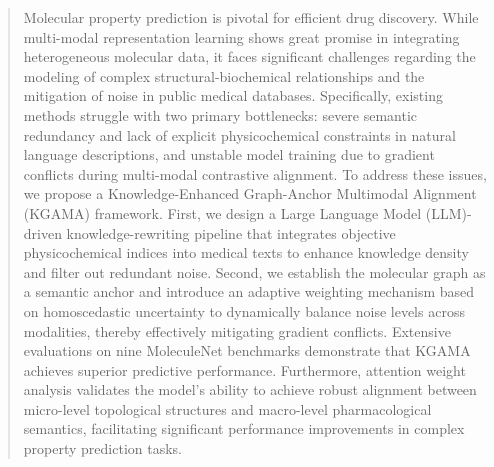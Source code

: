 \documentclass[journal]{IEEEtran}
\begin{document}
% 











\maketitle

\begin{abstract}
Molecular property prediction is pivotal for efficient drug discovery. While multi-modal representation learning shows great promise in integrating heterogeneous molecular data, it faces significant challenges regarding the modeling of complex structural-biochemical relationships and the mitigation of noise in public medical databases. Specifically, existing methods struggle with two primary bottlenecks: severe semantic redundancy and lack of explicit physicochemical constraints in natural language descriptions, and unstable model training due to gradient conflicts during multi-modal contrastive alignment. To address these issues, we propose a Knowledge-Enhanced Graph-Anchor Multimodal Alignment (KGAMA) framework. First, we design a Large Language Model (LLM)-driven knowledge-rewriting pipeline that integrates objective physicochemical indices into medical texts to enhance knowledge density and filter out redundant noise. Second, we establish the molecular graph as a semantic anchor and introduce an adaptive weighting mechanism based on homoscedastic uncertainty to dynamically balance noise levels across modalities, thereby effectively mitigating gradient conflicts. Extensive evaluations on nine MoleculeNet benchmarks demonstrate that KGAMA achieves superior predictive performance. Furthermore, attention weight analysis validates the model's ability to achieve robust alignment between micro-level topological structures and macro-level pharmacological semantics, facilitating significant performance improvements in complex property prediction tasks.
\end{abstract}
\end{document}
